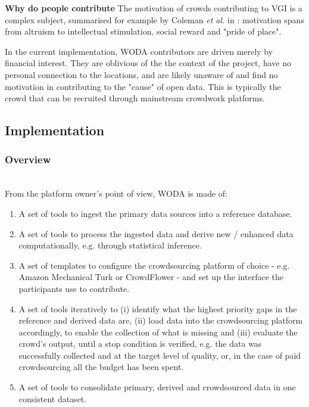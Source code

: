 \textbf{Why do people contribute} The motivation of crowds contributing to VGI is a complex subject, summarised for example by Coleman {\it et al.} in \cite{Coleman:2009vd}: motivation spans from altruism to intellectual stimulation, social reward and "pride of place".

In the current implementation, WODA contributors are driven merely by financial interest. They are oblivious of the the context of the project, have no personal connection to the locations, and are likely unaware of and find no motivation in contributing to the "cause" of open data. This is typically the crowd that can be recruited through mainstream crowdwork platforms. 

\subsection{Implementation}

\subsubsection{Overview} \leavevmode \\ %

From the platform owner's point of view, WODA is made of:

\begin{enumerate}
    \item A set of tools to ingest the primary data sources into a reference database.
    \item A set of tools to process the ingested data and derive new / enhanced data computationally, e.g. through statistical inference.
    \item A set of templates to configure the crowdsourcing platform of choice - e.g. Amazon Mechanical Turk or CrowdFlower - and set up the interface the participants use to contribute.
    \item A set of tools iteratively to (i) identify what the highest priority gaps in the reference and derived data are, (ii) load data into the crowdsourcing platform accordingly, to enable the collection of what is missing and (iii) evaluate the crowd's output, until a stop condition is verified, e.g. the data was successfully collected and at the target level of quality, or, in the case of paid crowdsourcing all the budget has been spent.
    \item A set of tools to consolidate primary, derived and crowdsourced data in one consistent dataset.
\end{enumerate}

